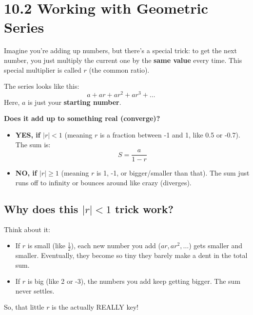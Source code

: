 \documentclass{article}
\begin{document}
\newpage

\section{10.2 Working with Geometric Series}

\begin{tcolorbox}[colback=gray!10!white,colframe=gray!75!black,title=What's a Geometric Series Anyway?]
Imagine you're adding up numbers, but there's a special trick: to get the next number, you just multiply the current one by the \textbf{same value} every time. This special multiplier is called \(r\) (the common ratio).

The series looks like this:
\[
a + ar + ar^2 + ar^3 + \dots \quad \text{  }
\]
Here, \(a\) is just your \textbf{starting number}.

\textbf{Does it add up to something real (converge)?}
\begin{itemize}
    \item \textbf{YES, if \(|r| < 1\)} (meaning \(r\) is a fraction between -1 and 1, like 0.5 or -0.7).
    The sum is: \[ \boxed{S = \frac{a}{1-r}} \]
    \item \textbf{NO, if \(|r| \ge 1\)} (meaning \(r\) is 1, -1, or bigger/smaller than that). The sum just runs off to infinity or bounces around like crazy (diverges).
\end{itemize}

\end{tcolorbox}

\subsection*{Why does this \(|r|<1\) trick work?}
Think about it:
\begin{itemize}
    \item If \(r\) is small (like \(\frac{1}{2}\)), each new number you add (\(ar, ar^2, \dots\)) gets smaller and smaller. Eventually, they become so tiny they barely make a dent in the total sum. 
    \item If \(r\) is big (like 2 or -3), the numbers you add keep getting bigger. The sum never settles. 
\end{itemize}
So, that little \(r\) is the actually REALLY key!
\end{document}

